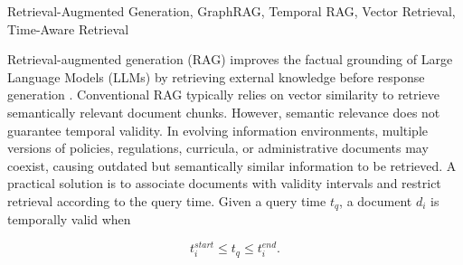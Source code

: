\documentclass[conference]{IEEEtran}
\numberwithin{equation}{section}
\begin{document}
\maketitle

\begin{abstract}
Retrieval-Augmented Generation (RAG) improves large language models by grounding responses in external knowledge. However, conventional vector retrieval may return outdated information when multiple document versions coexist. Temporal filtering addresses this problem by restricting retrieval to information valid at the query time, while GraphRAG additionally exploits
entity relationships to support structured reasoning. This raises an important question: when both approaches use equivalent temporal constraints, does graph structure still provide additional benefits? This paper presents a controlled protocol for comparing Temporal
Vector RAG and Temporal GraphRAG using the same corpus and temporal metadata. The protocol covers factual, temporal, relational, multi-hop, and historical queries and specifies retrieval effectiveness, answer accuracy, temporal accuracy, and efficiency metrics. The current manuscript reports the dataset and evaluation design; numerical benchmark results are reported only after the frozen testset and four-system experiment have been executed.
\end{abstract}

\begin{IEEEkeywords}
Retrieval-Augmented Generation, GraphRAG, Temporal RAG,
Vector Retrieval, Time-Aware Retrieval
\end{IEEEkeywords}

Retrieval-augmented generation (RAG) improves the factual grounding of Large Language Models (LLMs) by retrieving external knowledge before response generation \cite{Lewis2020, Gao2023}. Conventional RAG typically relies on vector similarity to retrieve semantically relevant document chunks. However, semantic relevance does not guarantee temporal validity. In evolving information environments, multiple versions of policies, regulations, curricula, or administrative documents may coexist, causing
outdated but semantically similar information to be retrieved. A practical solution is to associate documents with validity intervals and restrict retrieval according to the query time. Given a query time $t_q$, a document $d_i$ is temporally valid when

\begin{equation}
t_i^{start} \leq t_q \leq t_i^{end}.
\end{equation}
\end{document}
